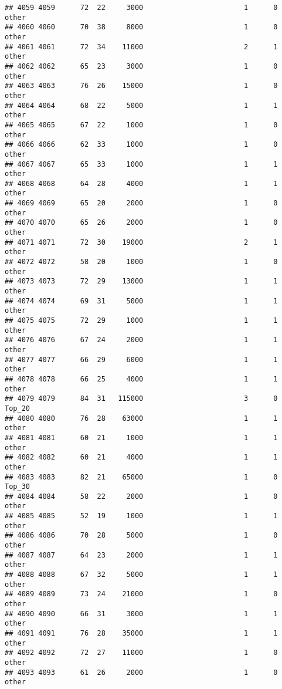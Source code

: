 \documentclass[
]{article}
\begin{document}
\begin{verbatim}
## 4059 4059      72  22     3000                        1      0    other
## 4060 4060      70  38     8000                        1      0    other
## 4061 4061      72  34    11000                        2      1    other
## 4062 4062      65  23     3000                        1      0    other
## 4063 4063      76  26    15000                        1      0    other
## 4064 4064      68  22     5000                        1      1    other
## 4065 4065      67  22     1000                        1      0    other
## 4066 4066      62  33     1000                        1      0    other
## 4067 4067      65  33     1000                        1      1    other
## 4068 4068      64  28     4000                        1      1    other
## 4069 4069      65  20     2000                        1      0    other
## 4070 4070      65  26     2000                        1      0    other
## 4071 4071      72  30    19000                        2      1    other
## 4072 4072      58  20     1000                        1      0    other
## 4073 4073      72  29    13000                        1      1    other
## 4074 4074      69  31     5000                        1      1    other
## 4075 4075      72  29     1000                        1      1    other
## 4076 4076      67  24     2000                        1      1    other
## 4077 4077      66  29     6000                        1      1    other
## 4078 4078      66  25     4000                        1      1    other
## 4079 4079      84  31   115000                        3      0   Top_20
## 4080 4080      76  28    63000                        1      1    other
## 4081 4081      60  21     1000                        1      1    other
## 4082 4082      60  21     4000                        1      1    other
## 4083 4083      82  21    65000                        1      0   Top_30
## 4084 4084      58  22     2000                        1      0    other
## 4085 4085      52  19     1000                        1      1    other
## 4086 4086      70  28     5000                        1      0    other
## 4087 4087      64  23     2000                        1      1    other
## 4088 4088      67  32     5000                        1      1    other
## 4089 4089      73  24    21000                        1      0    other
## 4090 4090      66  31     3000                        1      1    other
## 4091 4091      76  28    35000                        1      1    other
## 4092 4092      72  27    11000                        1      0    other
## 4093 4093      61  26     2000                        1      0    other

\end{verbatim}
\end{document}
